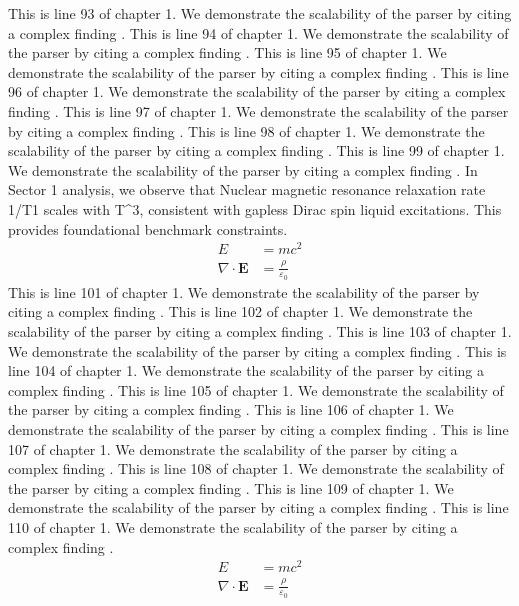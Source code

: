 This is line 93 of chapter 1. We demonstrate the scalability of the parser by citing a complex finding \cite{ref1_93}.
This is line 94 of chapter 1. We demonstrate the scalability of the parser by citing a complex finding \cite{ref1_94}.
This is line 95 of chapter 1. We demonstrate the scalability of the parser by citing a complex finding \cite{ref1_95}.
This is line 96 of chapter 1. We demonstrate the scalability of the parser by citing a complex finding \cite{ref1_96}.
This is line 97 of chapter 1. We demonstrate the scalability of the parser by citing a complex finding \cite{ref1_97}.
This is line 98 of chapter 1. We demonstrate the scalability of the parser by citing a complex finding \cite{ref1_98}.
This is line 99 of chapter 1. We demonstrate the scalability of the parser by citing a complex finding \cite{ref1_99}.
In Sector 1 analysis, we observe that Nuclear magnetic resonance relaxation rate 1/T1 scales with T^3, consistent with gapless Dirac spin liquid excitations. This provides foundational benchmark constraints.
\begin{align*}
  E &= mc^2 \\
  \nabla \cdot \mathbf{E} &= \frac{\rho}{\varepsilon_0}
\end{align*}
This is line 101 of chapter 1. We demonstrate the scalability of the parser by citing a complex finding \cite{ref1_101}.
This is line 102 of chapter 1. We demonstrate the scalability of the parser by citing a complex finding \cite{ref1_102}.
This is line 103 of chapter 1. We demonstrate the scalability of the parser by citing a complex finding \cite{ref1_103}.
This is line 104 of chapter 1. We demonstrate the scalability of the parser by citing a complex finding \cite{ref1_104}.
This is line 105 of chapter 1. We demonstrate the scalability of the parser by citing a complex finding \cite{ref1_105}.
This is line 106 of chapter 1. We demonstrate the scalability of the parser by citing a complex finding \cite{ref1_106}.
This is line 107 of chapter 1. We demonstrate the scalability of the parser by citing a complex finding \cite{ref1_107}.
This is line 108 of chapter 1. We demonstrate the scalability of the parser by citing a complex finding \cite{ref1_108}.
This is line 109 of chapter 1. We demonstrate the scalability of the parser by citing a complex finding \cite{ref1_109}.
This is line 110 of chapter 1. We demonstrate the scalability of the parser by citing a complex finding \cite{ref1_110}.
\begin{align*}
  E &= mc^2 \\
  \nabla \cdot \mathbf{E} &= \frac{\rho}{\varepsilon_0}
\end{align*}
